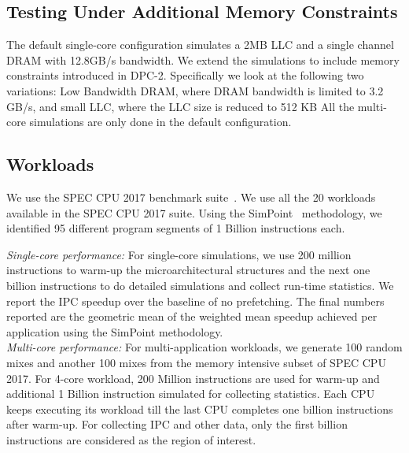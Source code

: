 \subsection{Testing Under Additional Memory Constraints}
\label{Method-AdditionalMem}
The default single-core configuration simulates a 2MB LLC and a single channel
DRAM with 12.8GB/s bandwidth. We extend the simulations to include memory
constraints introduced in DPC-2. Specifically we look at the following two
variations: Low Bandwidth DRAM, where DRAM bandwidth is limited to 3.2 GB/s,
and small LLC, where the LLC size is reduced to 512 KB All the multi-core
simulations are only done in the default configuration.

\subsection{Workloads}
\label{Method-Workloads}

We use the SPEC CPU 2017 benchmark suite~\cite{SPEC2017}. We use all the 20
workloads available in the SPEC CPU 2017 suite. Using the SimPoint~\cite{SimPoint}
methodology, we identified 95 different program segments of 1 Billion
instructions each.

\noindent \textit{Single-core performance:} For single-core simulations, we use 200
million instructions to warm-up the microarchitectural structures and the next
one billion instructions to do detailed simulations and collect run-time
statistics. We report the IPC speedup over the baseline of no prefetching.
The final numbers reported are the geometric mean of the weighted mean speedup 
achieved per application using the SimPoint methodology.\\

\noindent \textit{Multi-core performance:} For multi-application workloads, we generate
100 random mixes and another 100 mixes from the memory intensive subset of
SPEC CPU 2017. For 4-core workload, 200 Million instructions are used for warm-up
and additional 1 Billion instruction simulated for collecting statistics.
Each CPU keeps executing its workload till the last CPU completes one billion
instructions after warm-up. For collecting IPC and other data, only the first
billion instructions are considered as the region of interest.\\

